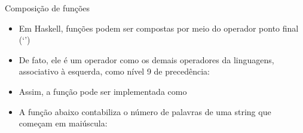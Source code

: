 \begin{frame}[fragile]{Composição de funções}

    \begin{itemize}
        \item Em Haskell, funções podem ser compostas por meio do operador ponto final
            (`')

        \item De fato, ele é um operador como os demais operadores da linguagens, associativo
            à esquerda, como nível 9 de precedência:

        \item Assim, a função  pode ser implementada como


        \item A função abaixo contabiliza o número de palavras de uma string que começam em
            maiúscula:


    \end{itemize}

\end{frame}
